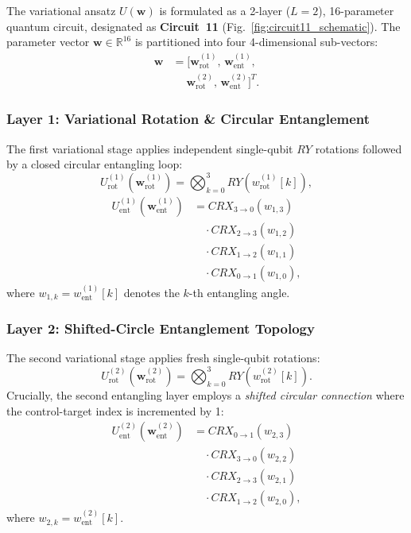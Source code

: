 \documentclass[pdflatex,sn-mathphys-num]{sn-jnl}%
\theoremstyle{thmstyleone}%
\theoremstyle{thmstyletwo}%
\theoremstyle{thmstylethree}%
\begin{document}
The variational ansatz $U(\mathbf{w})$ is formulated as a 2-layer ($L=2$), 16-parameter quantum circuit, designated as \textbf{Circuit~11} (Fig.~\ref{fig:circuit11_schematic}). The parameter vector $\mathbf{w} \in \mathbb{R}^{16}$ is partitioned into four 4-dimensional sub-vectors:
\begin{align}
\mathbf{w} &= \big[ \mathbf{w}_{\mathrm{rot}}^{(1)}, \, \mathbf{w}_{\mathrm{ent}}^{(1)}, \nonumber \\
&\quad\; \mathbf{w}_{\mathrm{rot}}^{(2)}, \, \mathbf{w}_{\mathrm{ent}}^{(2)} \big]^T.
\label{eq:weight_partition}
\end{align}

\subsubsection{Layer 1: Variational Rotation \& Circular Entanglement}
The first variational stage applies independent single-qubit $RY$ rotations followed by a closed circular entangling loop:
\begin{equation}
U_{\mathrm{rot}}^{(1)}(\mathbf{w}_{\mathrm{rot}}^{(1)}) = \bigotimes_{k=0}^3 RY\left(w_{\mathrm{rot}}^{(1)}[k]\right),
\label{eq:rot_layer1}
\end{equation}
\begin{align}
U_{\mathrm{ent}}^{(1)}(\mathbf{w}_{\mathrm{ent}}^{(1)}) &= CRX_{3 \to 0}(w_{1,3}) \nonumber \\
&\quad \cdot CRX_{2 \to 3}(w_{1,2}) \nonumber \\
&\quad \cdot CRX_{1 \to 2}(w_{1,1}) \nonumber \\
&\quad \cdot CRX_{0 \to 1}(w_{1,0}),
\label{eq:ent_layer1}
\end{align}
where $w_{1,k} = w_{\mathrm{ent}}^{(1)}[k]$ denotes the $k$-th entangling angle.

\subsubsection{Layer 2: Shifted-Circle Entanglement Topology}
The second variational stage applies fresh single-qubit rotations:
\begin{equation}
U_{\mathrm{rot}}^{(2)}(\mathbf{w}_{\mathrm{rot}}^{(2)}) = \bigotimes_{k=0}^3 RY\left(w_{\mathrm{rot}}^{(2)}[k]\right).
\label{eq:rot_layer2}
\end{equation}
Crucially, the second entangling layer employs a \textit{shifted circular connection} where the control-target index is incremented by 1:
\begin{align}
U_{\mathrm{ent}}^{(2)}(\mathbf{w}_{\mathrm{ent}}^{(2)}) &= CRX_{0 \to 1}(w_{2,3}) \nonumber \\
&\quad \cdot CRX_{3 \to 0}(w_{2,2}) \nonumber \\
&\quad \cdot CRX_{2 \to 3}(w_{2,1}) \nonumber \\
&\quad \cdot CRX_{1 \to 2}(w_{2,0}),
\label{eq:ent_layer2}
\end{align}
where $w_{2,k} = w_{\mathrm{ent}}^{(2)}[k]$.
\end{document}
